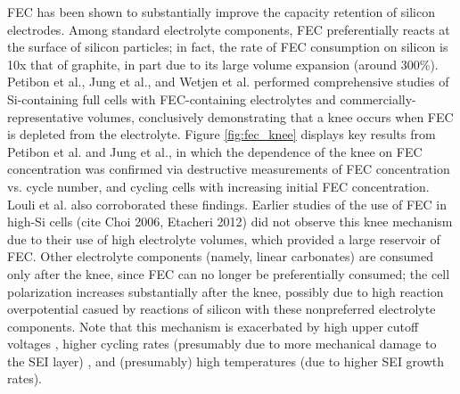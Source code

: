 \documentclass[journal=jpclcd,manuscript=article]{achemso}
\begin{document}
FEC has been shown to substantially improve the capacity retention of silicon electrodes.\cite{choi_effect_2006, etacheri_effect_2012}
Among standard electrolyte components, FEC preferentially reacts at the surface of silicon particles; in fact, the rate of FEC consumption on silicon is 10x that of graphite, in part due to its large volume expansion (around 300\%).\cite{wetjen_differentiating_2017}
Petibon et al.\cite{petibon_studies_2016},
Jung et al.\cite{jung_consumption_2016},
and Wetjen et al.\cite{wetjen_differentiating_2017}
performed comprehensive studies of Si-containing full cells with FEC-containing electrolytes and commercially-representative volumes,
conclusively demonstrating that a knee occurs when FEC is depleted from the electrolyte.
Figure \ref{fig:fec_knee} displays key results from Petibon et al.\cite{petibon_studies_2016} and
Jung et al.\cite{jung_consumption_2016}, in which the dependence of the knee on FEC concentration was confirmed via destructive measurements of FEC concentration vs. cycle number\cite{petibon_studies_2016}, and cycling cells with increasing initial FEC concentration\cite{jung_consumption_2016}.
Louli et al.\cite{louli_operando_2019} also corroborated these findings.
Earlier studies of the use of FEC in high-Si cells (cite Choi 2006, Etacheri 2012) did not observe this knee mechanism due to their use of high electrolyte volumes, which provided a large reservoir of FEC.
Other electrolyte components (namely, linear carbonates) are consumed only after the knee, since FEC can no longer be preferentially consumed\cite{petibon_studies_2016}; the cell polarization increases substantially after the knee\cite{petibon_studies_2016, jung_consumption_2016, wetjen_differentiating_2017}, possibly due to high reaction overpotential casued by reactions of silicon with these nonpreferred electrolyte components.
Note that this mechanism is exacerbated by high upper cutoff voltages \cite{petibon_studies_2016}, higher cycling rates (presumably due to more mechanical damage to the SEI layer) \cite{petibon_studies_2016}, and (presumably) high temperatures (due to higher SEI growth rates).
\end{document}
